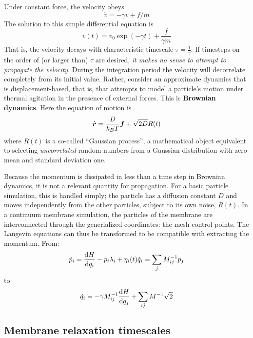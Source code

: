 Under constant force, the velocity obeys
\begin{equation}
\dot{v} = -\gamma v + f/m
\end{equation}
The solution to this simple differential equation is
\begin{equation}
v(t) = v_0 \exp(-\gamma t) + \frac{f}{\gamma m}
\end{equation}
That is, the velocity decays with characteristic timescale $\tau=\frac{1}{\gamma}$.
If timesteps on the order of (or larger than) $\tau$ are desired, {\it it makes no sense to attempt to propagate the velocity}.
During the integration period the velocity will decorrelate completely from its initial value.
Rather, consider an approximate dynamics that is displacement-based, that is, that attempts to model a particle's motion under thermal agitation in the presence of external forces.
This is {\bf Brownian dynamics}. 
Here the equation of motion is 
\begin{equation}
\dot{\boldsymbol{r}} = \frac{D}{k_B T} \boldsymbol{f} + \sqrt{2 D} R(t)
\end{equation}
where $R(t)$ is a so-called ``Gaussian process'', a mathematical object equivalent to selecting {\it uncorrelated} random numbers from a Gaussian distribution with zero mean and standard deviation one.

Because the momentum is dissipated in less than a time step in Brownian dynamics, it is not a relevant quantity for propagation.
For a basic particle simulation, this is handled simply; the particle has a diffusion constant $D$ and moves independently from the other particles, subject to its own noise, $R(t)$.
In a continuum membrane simulation, the particles of the membrane are interconnected through the generlalized coordinates: the mesh control points.
The Langevin equations can thus be transformed to be compatible with extracting the momentum.
From:
\begin{equation}
\dot{p}_i = \frac{\textrm{d} H}{\textrm{d} q_i} - \dot{p}_i \lambda_i + \eta_i(t) \nonumber \\
\dot{q}_i = \sum_j M_{ij}^{-1} p_j
\end{equation}
to
\begin{equation}
\dot{q}_i = -\gamma M_{ij}^{-1} \frac{\textrm{d} H}{\textrm{d} q_j} + \sum_{ij} M^{-1} \sqrt{2} 
\end{equation}










\subsection{Membrane relaxation timescales}




